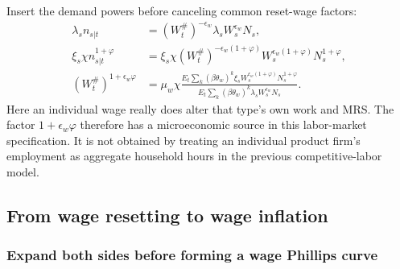 Insert the demand powers before canceling common reset-wage factors:
\begin{align}
 \lambda_sn_{s|t}
 &=(W_t^{\#})^{-\epsilon_w}\lambda_sW_s^{\epsilon_w}N_s,\\
 \xi_s\chi n_{s|t}^{1+\varphi}
 &=\xi_s\chi(W_t^{\#})^{-\epsilon_w(1+\varphi)}
                         W_s^{\epsilon_w(1+\varphi)}N_s^{1+\varphi},\\
 (W_t^{\#})^{1+\epsilon_w\varphi}
 &=\mu_w\chi\frac{E_t\sum_k(\beta\theta_w)^k
                \xi_sW_s^{\epsilon_w(1+\varphi)}N_s^{1+\varphi}}
              {E_t\sum_k(\beta\theta_w)^k\lambda_sW_s^{\epsilon_w}N_s}.
 \label{eq:sw-reset-nonlinear}
\end{align}
Here an individual wage really does alter that type's own work and MRS. The
factor $1+\epsilon_w\varphi$ therefore has a microeconomic source in this
labor-market specification. It is not obtained by treating an individual
product firm's employment as aggregate household hours in the previous
competitive-labor model.

\subsection{From wage resetting to wage inflation}

\subsubsection{Expand both sides before forming a wage Phillips curve}

